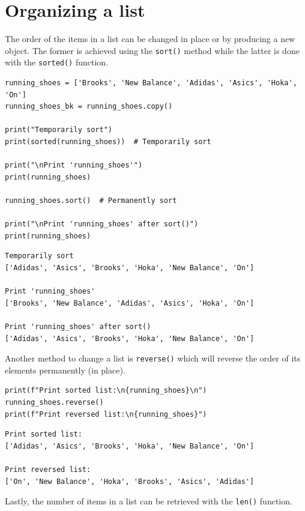 \documentclass[10pt]{book}
\begin{document}
\section{Organizing a list}
\label{sec:org60043ab}
The order of the items in a list can be changed in place or by producing a new object. The former is achieved using the \texttt{sort()} method while the latter is done with the \texttt{sorted()} function.

\label{org79ced89}
\begin{verbatim}
running_shoes = ['Brooks', 'New Balance', 'Adidas', 'Asics', 'Hoka', 'On']
running_shoes_bk = running_shoes.copy()

print("Temporarily sort")
print(sorted(running_shoes))  # Temporarily sort

print("\nPrint 'running_shoes'")
print(running_shoes)

running_shoes.sort()  # Permanently sort

print("\nPrint 'running_shoes' after sort()")
print(running_shoes)
\end{verbatim}

\label{orgfe0e1e7}
\begin{verbatim}
Temporarily sort
['Adidas', 'Asics', 'Brooks', 'Hoka', 'New Balance', 'On']

Print 'running_shoes'
['Brooks', 'New Balance', 'Adidas', 'Asics', 'Hoka', 'On']

Print 'running_shoes' after sort()
['Adidas', 'Asics', 'Brooks', 'Hoka', 'New Balance', 'On']
\end{verbatim}

Another method to change a list is \texttt{reverse()} which will reverse the order of its elements permanently (in place).

\label{org15f08b9}
\begin{verbatim}
print(f"Print sorted list:\n{running_shoes}\n")
running_shoes.reverse()
print(f"Print reversed list:\n{running_shoes}")
\end{verbatim}

\label{orgf62166a}
\begin{verbatim}
Print sorted list:
['Adidas', 'Asics', 'Brooks', 'Hoka', 'New Balance', 'On']

Print reversed list:
['On', 'New Balance', 'Hoka', 'Brooks', 'Asics', 'Adidas']
\end{verbatim}

Lastly, the number of items in a list can be retrieved with the \texttt{len()} function.
\end{document}
